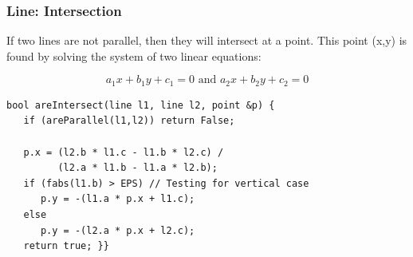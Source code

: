 \documentclass{beamer}
\begin{document}
\begin{frame}
  \frametitle{Line: Intersection} 
  {\smaller 
    
    If two lines are not parallel, then they will intersect at a
    point. This point (x,y) is found by solving the system of two
    linear equations: 

    \begin{equation*}
      a_1x+b_1y+c_1 = 0 \text{ and } a_2x+b_2y+c_2 = 0
    \end{equation*}

    \vfill

    \begin{exampleblock}{}
\begin{verbatim}
bool areIntersect(line l1, line l2, point &p) {
   if (areParallel(l1,l2)) return False;

   p.x = (l2.b * l1.c - l1.b * l2.c) / 
         (l2.a * l1.b - l1.a * l2.b);
   if (fabs(l1.b) > EPS) // Testing for vertical case
      p.y = -(l1.a * p.x + l1.c);
   else
      p.y = -(l2.a * p.x + l2.c);
   return true; }}
\end{verbatim}
    \end{exampleblock}

  }
\end{frame}
\end{document}
